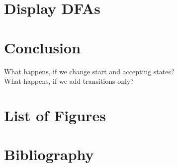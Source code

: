 \documentclass[a4paper, oneside, 11pt]{report}
\theoremstyle{definition}
\theoremstyle{remark}
\begin{document}






\chapter{Display DFAs}




\chapter{Conclusion}

What happens, if we change start and accepting states? \\
What happens, if we add transitions only?


\appendix
\chapter{List of Figures}
\chapter{Bibliography}
\end{document}
